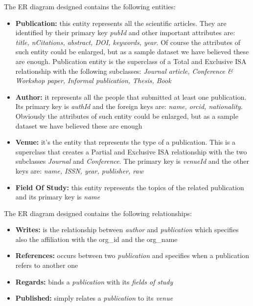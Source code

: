 \documentclass{Configuration_Files/PoliMi3i_thesis}
\begin{document}
\newpage
The ER diagram designed contains the following entities:
\begin{itemize}
    \item \textbf{Publication:} this entity represents all the scientific articles. They are identified by their primary key \emph{pubId}
            and other important attributes are: \emph{title, nCitations, abstract, DOI, keywords, year}.
            Of course the attributes of such entity could be enlarged, but as a sample dataset we have believed these are enough.
            Publication entity is the superclass of a Total and Exclusive ISA relationship with the following subclasses:
            \emph{Journal article, Conference \& Workshop paper, Informal publication, Thesis, Book}
    \item \textbf{Author:} it represents all the people that submitted at least one publication. Its primary key is \emph{authId} and the
            foreign keys are: \emph{name, orcid, nationality}.
            Obviously the attributes of such entity could be enlarged, but as a sample dataset we have believed these are enough
    \item \textbf{Venue:} it's the entity that represents the type of a publication. This is a superclass that creates a Partial and Exclusive
            ISA relationship with the two subclasses \emph{Journal} and \emph{Conference}.
            The primary key is \emph{venueId} and the other keys are: \emph{name, ISSN, year, publisher, raw}
    \item \textbf{Field Of Study:} this entity represents the topics of the related publication and its primary key is \emph{name}
\end{itemize}
\bigskip

The ER diagram designed contains the following relationships:
\begin{itemize}
    \item \textbf{Writes:} is the relationship between \emph{author} and \emph{publication} which specifies also the affiliation
            with the org\_id and the org\_name
    \item \textbf{References:} occurs between two \emph{publication} and specifies when a publication refers to another one
    \item \textbf{Regards:} binds a \emph{publication} with its \emph{fields of study}
    \item \textbf{Published:} simply relates a \emph{publication} to its \emph{venue}
\end{itemize}
\end{document}
